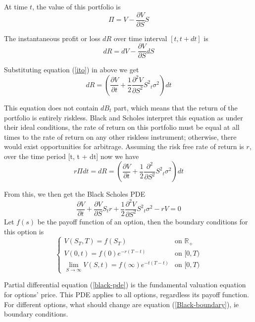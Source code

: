 \documentclass[11pt]{book}
\def\bR{{\mathbb{R}}}
\begin{document}
At time $t$, the value of this portfolio is
\begin{equation}
\Pi = V - \frac{\partial V}{\partial S} S
\end{equation}

The instantaneous profit or loss  $dR$ over time interval $[t, t+dt]$ is
\begin{equation}
dR = dV - \frac{\partial V}{\partial S} dS
\end{equation}

Substituting equation (\ref{ito}) in above we get
\begin{equation}
dR= (\frac{\partial V}{\partial t} + \frac{1}{2}\frac{{\partial}^2 V }{\partial S^2} {S^2}_t {\sigma}^2 ) dt
\end{equation}

This equation does not contain $dB_t$ part, which means that the return of the portfolio is entirely riskless. Black and Scholes interpret this equation as under their ideal conditions, the rate of return on this portfolio must be equal at all times to the rate of return on any other riskless instrument; otherwise, there would exist opportunities for arbitrage. Assuming the risk free rate of return is $r$,  over the time period [t, t + dt] now we have
\begin{equation}
r \Pi dt = dR =  (\frac{\partial V}{\partial t} + \frac{1}{2}\frac{{\partial}^2}{\partial S^2} {S^2}_t {\sigma}^2 ) dt
\end{equation}

From this, we then get the Black Scholes PDE
\begin{equation}\label{black-pde}
\frac{\partial V}{\partial t} + \frac{\partial V }{\partial S} S_t r + \frac{1}{2} \frac{{\partial}^2 V}{\partial S^2} {S^2}_t {\sigma}^2 -rV=0
\end{equation}
Let $f(s)$ be the payoff function of an option, then the boundary conditions for this option is
\begin{equation}\label{Black-boundary}
\begin{cases}
V(S_T,T) =f(S_T)  & \text{on } \bR_+ \\
V(0,t)=f(0)e^{-r(T-t)} & \text{on } [0,T) \\
\displaystyle\lim_{S \to \infty} V(S,t)= f(\infty)e^{-t(T-t)} & \text{on } [0,T)
\end{cases}
\end{equation}

Partial differential equation (\ref{black-pde}) is the fundamental valuation equation for options' price. This PDE applies to all options, regardless its payoff function. For different options, what should change are equation (\ref{Black-boundary}), ie boundary conditions.
\end{document}
